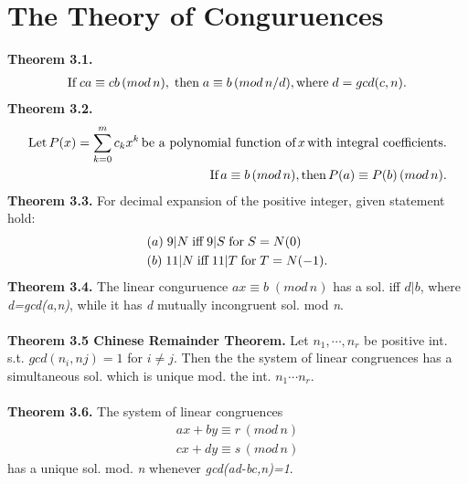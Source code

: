 \documentclass[a4paper,10pt]{article}
\begin{document}
\section{The Theory of Conguruences}
\textbf{Theorem 3.1.}
\begin{align}
\textnormal{If} \; ca\equiv cb \, (mod \,n), \; \textnormal{then} \; a\equiv b \, (mod \, n/d), \textnormal{where} \; d=gcd(c,n).
\end{align}
\textbf{Theorem 3.2.} 
\begin{align}
\textnormal{Let} \, P(x)=\sum_{k=0}^{m}{c_{k}x^{k}} \, \textnormal{be a polynomial function of} \, x \, \textnormal{with integral coefficients.} \nonumber
\\ \textnormal{If} \, a\equiv b \, (mod \, n), \textnormal{then} \, P(a)\equiv P(b) \, (mod \, n).
\end{align}
\textbf{Theorem 3.3.} For decimal expansion of the positive integer, given statement hold:
\begin{align}
& (a) \; 9|N \; \textnormal{iff} \; 9|S \; \textnormal{for} \; S=N(0) \\
& (b) \; 11|N \; \textnormal{iff} \; 11|T \; \textnormal{for} \; T=N(-1).
\end{align}
\textbf{Theorem 3.4.} The linear conguruence \textit{$ax\equiv b \; (mod \, n)$} has a sol. iff \textit{$d|b$}, where \textit{d=gcd(a,n)}, while it has \textit{d} mutually incongruent sol. mod \textit{n}. \\ \\
\textbf{Theorem 3.5 Chinese Remainder Theorem.} Let \textit{$n_{1},\cdots,n_{r}$} be positive int. s.t. \textit{$gcd(n_{i},n{j})=1$} for \textit{$i\neq j$}. Then the the system of linear congruences has a simultaneous sol. which is unique mod. the int. \textit{$n_{1}\cdots n_{r}$}. \\ \\
\textbf{Theorem 3.6.} The system of linear congruences
\begin{align}
ax+by\equiv r \, (mod \, n) \nonumber \\
cx+dy\equiv s \, (mod \, n)
\end{align}
has a unique sol. mod. \textit{n} whenever \textit{gcd(ad-bc,n)=1}.
\end{document}
